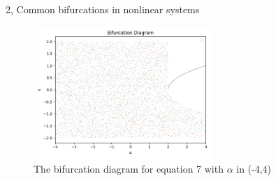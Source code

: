 \documentclass[10pt,a4paper]{article}
\begin{document}
\begin{task}{2, Common bifurcations in nonlinear systems}
    \begin{figure}[H]
        \centering
        \includegraphics[width=0.6\textwidth]{../plots/task2_3.png}
        \caption{The bifurcation diagram for equation 7 with $\alpha$ in (-4,4)}
        \label{fig:task2_3_bifurcation}
    \end{figure}
\end{task}
\end{document}
